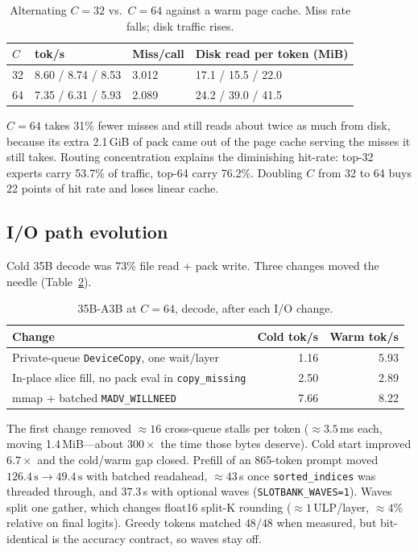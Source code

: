 \begin{table}[ht]
\centering
\caption{Alternating $C{=}32$ vs.\ $C{=}64$ against a warm page cache. Miss rate falls; disk traffic rises.}
\label{tab:c3264}
\begin{tabular}{@{}llll@{}}
\toprule
$C$ & tok/s & Miss/call & Disk read per token (MiB) \\
\midrule
32 & 8.60 / 8.74 / 8.53 & 3.012 & 17.1 / 15.5 / 22.0 \\
64 & 7.35 / 6.31 / 5.93 & 2.089 & 24.2 / 39.0 / 41.5 \\
\bottomrule
\end{tabular}
\end{table}

$C{=}64$ takes 31\% fewer misses and still reads about twice as much from disk, because its extra 2.1\,GiB of pack came out of the page cache serving the misses it still takes. Routing concentration explains the diminishing hit-rate: top-32 experts carry 53.7\% of traffic, top-64 carry 76.2\%. Doubling $C$ from 32 to 64 buys 22 points of hit rate and loses linear cache.

\subsection{I/O path evolution}

Cold 35B decode was 73\% file read + pack write. Three changes moved the needle (Table~\ref{tab:iowins}).

\begin{table}[ht]
\centering
\caption{35B-A3B at $C{=}64$, decode, after each I/O change.}
\label{tab:iowins}
\begin{tabular}{@{}lrr@{}}
\toprule
Change & Cold tok/s & Warm tok/s \\
\midrule
Private-queue \texttt{DeviceCopy}, one wait/layer & 1.16 & 5.93 \\
In-place slice fill, no pack eval in \texttt{copy\_missing} & 2.50 & 2.89 \\
mmap + batched \texttt{MADV\_WILLNEED} & 7.66 & 8.22 \\
\bottomrule
\end{tabular}
\end{table}

The first change removed $\approx 16$ cross-queue stalls per token ($\approx 3.5$\,ms each, moving 1.4\,MiB---about $300\times$ the time those bytes deserve). Cold start improved $6.7\times$ and the cold/warm gap closed. Prefill of an 865-token prompt moved $126.4\,\mathrm{s}\to 49.4\,\mathrm{s}$ with batched readahead, $\approx 43$\,s once \texttt{sorted\_indices} was threaded through, and $37.3$\,s with optional waves (\texttt{SLOTBANK\_WAVES=1}). Waves split one gather, which changes float16 split-K rounding ($\approx 1$\,ULP/layer, $\approx 4\%$ relative on final logits). Greedy tokens matched $48/48$ when measured, but bit-identical is the accuracy contract, so waves stay off.

